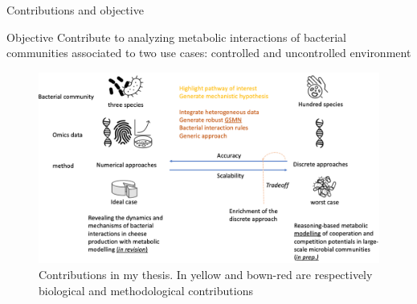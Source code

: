\documentclass[8pt]{beamer}
\begin{document}
\begin{frame}{Contributions and objective}
\vspace{-0.3cm}
\begin{block}{Objective}
 Contribute to analyzing metabolic interactions of bacterial communities associated to two use cases: controlled and uncontrolled environment
\end{block}
\begin{figure}
\includegraphics[width=\textwidth]{figures/objective}
\vspace{-0.6cm}\caption{Contributions in my thesis. In yellow and bown-red are respectively biological and methodological contributions}
\end{figure}



\end{frame}
\end{document}
